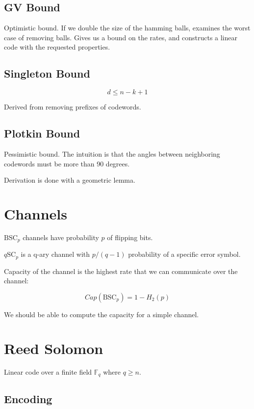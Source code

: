 \documentclass{idc_msc}
\newcommand{\Fq}[1][q]{{\mathbb{F}_{#1}}}
\newcommand{\BSC}[1][p]{{\text{BSC}_{#1}}}
\begin{document}
\subsection{GV Bound}

Optimistic bound.
If we double the size of the hamming balls, examines the worst case of removing balls.
Gives us a bound on the rates, and constructs a linear code with the requested properties.

\subsection{Singleton Bound}

\[d \le n - k + 1\]

Derived from removing prefixes of codewords.

\subsection{Plotkin Bound}

Pessimistic bound.
The intuition is that the angles between neighboring codewords must be more than 90 degrees.

Derivation is done with a geometric lemma.

\section{Channels}

\(\BSC\) channels have probability \(p\) of flipping bits.

\(q\text{SC}_p\) is a q-ary channel with \(p/(q-1)\) probability of a specific error symbol.

Capacity of the channel is the highest rate that we can communicate over the channel:

\[Cap(\BSC) = 1-H_2(p)\]

We should be able to compute the capacity for a simple channel.

\section{Reed Solomon}

Linear code over a finite field \(\Fq\) where \(q \ge n\).

\subsection{Encoding}
\end{document}
